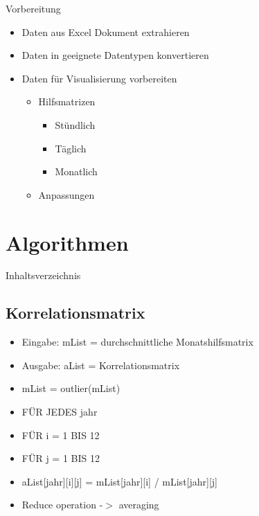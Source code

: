 \begin{frame}{Vorbereitung}
\begin{itemize}
	\item Daten aus Excel Dokument extrahieren
	\item Daten in geeignete Datentypen konvertieren
	\item Daten für Visualisierung vorbereiten
	\begin{itemize}
		\item Hilfsmatrizen
		\begin{itemize}
			\item Stündlich
			\item Täglich
			\item Monatlich
		\end{itemize}
		\item Anpassungen
	\end{itemize}
\end{itemize}
\end{frame}



\section{Algorithmen}
\begin{frame}{Inhaltsverzeichnis}
\tableofcontents[currentsection]
\end{frame}

\subsection{Korrelationsmatrix}
\begin{frame}{\insertsubsectionhead}
\begin{itemize}
	\item[] Eingabe: mList = durchschnittliche Monatshilfsmatrix
	\item[] Ausgabe: aList = Korrelationsmatrix
	\bigskip
	\item[] mList = outlier(mList)
	\item[]\quad FÜR JEDES jahr
	\item[]\quad\quad FÜR i = 1 BIS 12
	\item[]\quad\quad\quad FÜR j = 1 BIS 12
	\item[]\quad\quad\quad\quad aList[jahr][i][j] = mList[jahr][i] / mList[jahr][j]
	\item[] Reduce operation -$>$ averaging
\end{itemize}
\end{frame}

